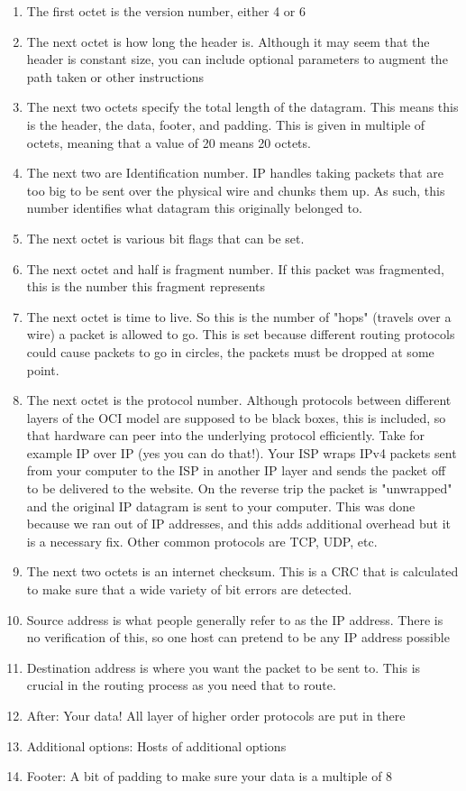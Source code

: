 \begin{enumerate}
  \item The first octet is the version number, either 4 or 6
  \item The next octet is how long the header is.
    Although it may seem that the header is constant size, you can include optional parameters to augment the path taken or other instructions
  \item The next two octets specify the total length of the datagram.
    This means this is the header, the data, footer, and padding.
    This is given in multiple of octets, meaning that a value of 20 means 20 octets.
  \item The next two are Identification number.
    IP handles taking packets that are too big to be sent over the physical wire and chunks them up.
    As such, this number identifies what datagram this originally belonged to.
  \item The next octet is various bit flags that can be set.
  \item The next octet and half is fragment number.
    If this packet was fragmented, this is the number this fragment represents
  \item The next octet is time to live.
    So this is the number of "hops" (travels over a wire) a packet is allowed to go.
    This is set because different routing protocols could cause packets to go in circles, the packets must be dropped at some point.
  \item The next octet is the protocol number.
    Although protocols between different layers of the OCI model are supposed to be black boxes, this is included, so that hardware can peer into the underlying protocol efficiently.
    Take for example IP over IP (yes you can do that!).
    Your ISP wraps IPv4 packets sent from your computer to the ISP in another IP layer and sends the packet off to be delivered to the website.
    On the reverse trip the packet is "unwrapped" and the original IP datagram is sent to your computer.
    This was done because we ran out of IP addresses, and this adds additional overhead but it is a necessary fix.
    Other common protocols are TCP, UDP, etc.
  \item The next two octets is an internet checksum.
    This is a CRC that is calculated to make sure that a wide variety of bit errors are detected.
  \item Source address is what people generally refer to as the IP address.
    There is no verification of this, so one host can pretend to be any IP address possible
  \item Destination address is where you want the packet to be sent to.
    This is crucial in the routing process as you need that to route.
  \item After: Your data! All layer of higher order protocols are put in there
  \item Additional options: Hosts of additional options
  \item Footer: A bit of padding to make sure your data is a multiple of 8
\end{enumerate}


